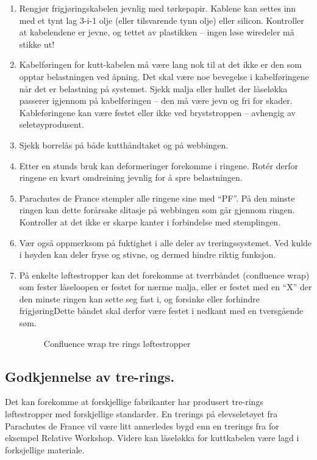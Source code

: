 \begin{enumerate}
\item Rengjør frigjøringskabelen jevnlig med tørkepapir. Kablene kan settes inn med et tynt lag 3-i-1 olje (eller tilsvarende tynn olje) eller silicon. Kontroller at kabelendene er jevne, og tettet av plastikken – ingen løse wiredeler må stikke ut!
\item Kabelføringen for kutt-kabelen må være lang nok til at det ikke er den som opptar belastningen ved åpning. Det skal være noe bevegelse i kabelføringene når det er belastning på systemet. Sjekk malja eller hullet der låseløkka passerer igjennom på kabelføringen – den må være jevn og fri for skader. Kableføringene kan være festet eller ikke ved bryststroppen – avhengig av seletøyprodusent.
\item Sjekk borrelås på både kutthåndtaket og på webbingen.
\item Etter en stunds bruk kan deformeringer forekomme i ringene. Rotér derfor ringene en kvart omdreining jevnlig for å spre belastningen.
\item Parachutes de France stempler alle ringene sine med ``PF''. På den minste ringen kan dette forårsake slitasje på webbingen som går gjennom ringen. Kontroller at det ikke er skarpe kanter i forbindelse med stemplingen.
\item Vær også oppmerksom på fuktighet i alle deler av treringssystemet. Ved kulde i høyden kan deler fryse og stivne, og dermed hindre riktig funksjon.
\item På enkelte løftestropper kan det forekomme at tverrbåndet (confluence wrap) som fester låseloopen er festet for nærme malja, eller er festet med en ``X'' der den minste ringen kan sette seg fast i, og forsinke eller forhindre frigjøringDette båndet skal derfor være festet i nedkant med en tversgående søm.
\begin{figure}
	\caption{Confluence wrap tre rings løftestropper}
\end{figure}

\end{enumerate}

\subsection{Godkjennelse av tre-rings.}
Det kan forekomme at forskjellige fabrikanter har produsert tre-rings løftestropper med forskjellige standarder. En trerings på elevseletøyet fra Parachutes de France vil være litt annerledes bygd enn en trerings fra for eksempel Relative Workshop. Videre kan låseløkka for kuttkabelen være lagd i forksjellige materiale.

